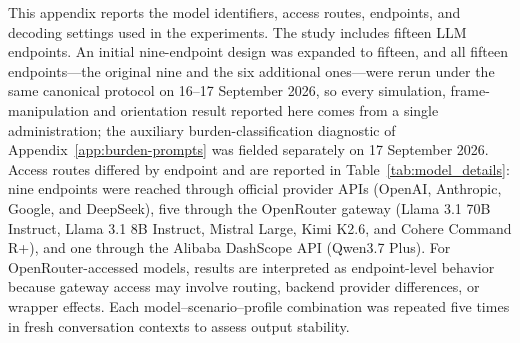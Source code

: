 \documentclass[11pt]{article}
\begin{document}
This appendix reports the model identifiers, access routes, endpoints, and decoding settings used in the experiments. The study includes fifteen LLM endpoints. An initial nine-endpoint design was expanded to fifteen, and all fifteen endpoints---the original nine and the six additional ones---were rerun under the same canonical protocol on 16--17 September 2026, so every simulation, frame-manipulation and orientation result reported here comes from a single administration; the auxiliary burden-classification diagnostic of Appendix~\ref{app:burden-prompts} was fielded separately on 17 September 2026. Access routes differed by endpoint and are reported in Table~\ref{tab:model_details}: nine endpoints were reached through official provider APIs (OpenAI, Anthropic, Google, and DeepSeek), five through the OpenRouter gateway (Llama 3.1 70B Instruct, Llama 3.1 8B Instruct, Mistral Large, Kimi K2.6, and Cohere Command R+), and one through the Alibaba DashScope API (Qwen3.7 Plus). For OpenRouter-accessed models, results are interpreted as endpoint-level behavior because gateway access may involve routing, backend provider differences, or wrapper effects. Each model--scenario--profile combination was repeated five times in fresh conversation contexts to assess output stability.
\end{document}

